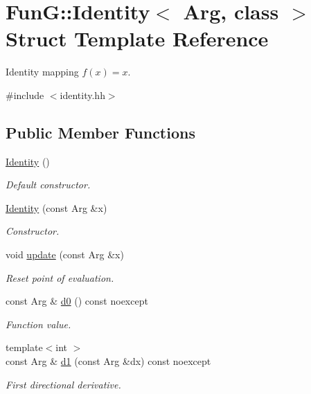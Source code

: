 \hypertarget{structFunG_1_1Identity}{\section{\-Fun\-G\-:\-:\-Identity$<$ \-Arg, class $>$ \-Struct \-Template \-Reference}
\label{structFunG_1_1Identity}
}


\-Identity mapping $ f(x)=x $.  




{\ttfamily \#include $<$identity.\-hh$>$}

\subsection*{\-Public \-Member \-Functions}
\begin{DoxyCompactItemize}
\item 
\hyperlink{structFunG_1_1Identity_ada0fd1a5a27fa45d1f89af87a8c0f26b}{\-Identity} ()
\begin{DoxyCompactList}\small\item\em \-Default constructor. \end{DoxyCompactList}\item 
\hyperlink{structFunG_1_1Identity_a080e9bf064c469a5141765f3ee0416b0}{\-Identity} (const \-Arg \&x)
\begin{DoxyCompactList}\small\item\em \-Constructor. \end{DoxyCompactList}\item 
void \hyperlink{structFunG_1_1Identity_acceedd6198948c7e1eb782f7a358a759}{update} (const \-Arg \&x)
\begin{DoxyCompactList}\small\item\em \-Reset point of evaluation. \end{DoxyCompactList}\item 
const \-Arg \& \hyperlink{structFunG_1_1Identity_ab1edf393c23ed1bef1d3d84c28289e36}{d0} () const noexcept
\begin{DoxyCompactList}\small\item\em \-Function value. \end{DoxyCompactList}\item 
{\footnotesize template$<$int $>$ }\\const \-Arg \& \hyperlink{structFunG_1_1Identity_a9f22755ffd38fa5712446c0120deea21}{d1} (const \-Arg \&dx) const noexcept
\begin{DoxyCompactList}\small\item\em \-First directional derivative. \end{DoxyCompactList}\end{DoxyCompactItemize}


